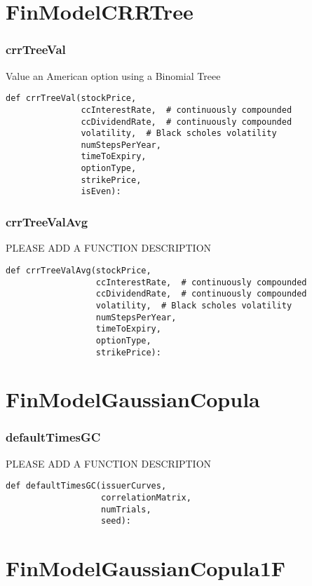 \documentclass[twoside,11pt]{book}
\begin{document}
\newpage
\section{FinModelCRRTree}

\subsubsection*{{\bf crrTreeVal}}
Value an American option using a Binomial Treee  

\begin{lstlisting}
def crrTreeVal(stockPrice,
               ccInterestRate,  # continuously compounded
               ccDividendRate,  # continuously compounded
               volatility,  # Black scholes volatility
               numStepsPerYear,
               timeToExpiry,
               optionType,
               strikePrice,
               isEven):
\end{lstlisting}

\subsubsection*{{\bf crrTreeValAvg}}
PLEASE ADD A FUNCTION DESCRIPTION

\begin{lstlisting}
def crrTreeValAvg(stockPrice,
                  ccInterestRate,  # continuously compounded
                  ccDividendRate,  # continuously compounded
                  volatility,  # Black scholes volatility
                  numStepsPerYear,
                  timeToExpiry,
                  optionType,
                  strikePrice):
\end{lstlisting}

\newpage
\section{FinModelGaussianCopula}

\subsubsection*{{\bf defaultTimesGC}}
PLEASE ADD A FUNCTION DESCRIPTION

\begin{lstlisting}
def defaultTimesGC(issuerCurves,
                   correlationMatrix,
                   numTrials,
                   seed):
\end{lstlisting}

\newpage
\section{FinModelGaussianCopula1F}
\end{document}
